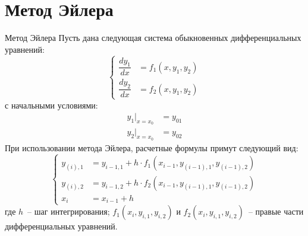 \documentclass[aspectratio=169, mathserif]{beamer}	%
\begin{document}
\section{Метод Эйлера}
\sectionframe

\begin{frame}[fragile, ]{Метод Эйлера}
\scriptsize
Пусть дана следующая система обыкновенных дифференциальных уравнений:
\vfill
\begin{equation}
	\left\{
	\begin{aligned}
		\dfrac{dy_1}{dx} &= f_1 \left(x, y_1, y_2\right) \\
		\dfrac{dy_2}{dx} &= f_2\left(x, y_1, y_2\right)
	\end{aligned}
	\right.
\end{equation}
\vfill
\noindent с начальными условиями:
\vfill
\begin{equation}
	\begin{aligned}
		y_1 \big |_{x=x_0} &= y_{01} \\
		y_2 \big |_{x=x_0} &= y_{02}
	\end{aligned}
\end{equation}
\vfill
При использовании метода Эйлера, расчетные формулы примут следующий вид:
\vfill
\begin{equation}\label{Eiler_system}
	\left\{
	\begin{aligned}
		y_{(i), 1} &= y_{i-1,1} + h \cdot f_1 \left(x_{i-1}, y_{(i-1),1}, y_{(i-1),2}\right) \\
		y_{(i), 2} &= y_{i-1,2} + h \cdot f_2 \left(x_{i-1}, y_{(i-1),1}, y_{(i-1),2}\right) \\
		x_{i} &= x_{i-1} + h
	\end{aligned}
	\right.
\end{equation}
\vfill
\noindent где $h$~-- шаг интегрирования; $f_1\left(x_i, y_{i, 1}, y_{i, 2}\right)$ и $f_2\left(x_i, y_{i, 1}, y_{i, 2}\right)$~-- правые части дифференциальных уравнений.
\vfill
\end{frame}
\end{document}
